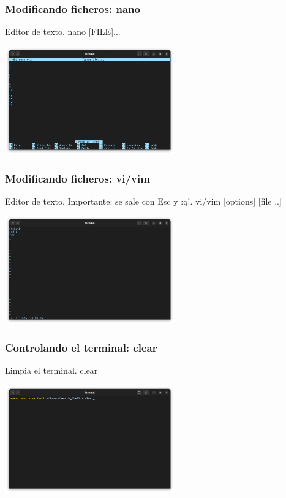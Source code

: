 \documentclass[10pt]{beamer}
\begin{document}
	\begin{frame}
		\frametitle{Modificando ficheros: nano}
		\begin{alertblock}{Editor de texto.}
			nano [FILE]...
		\end{alertblock}
		\begin{center}
			\includegraphics[width=0.55\textwidth]{nano}
		\end{center}
	\end{frame}
	
	\begin{frame}
		\frametitle{Modificando ficheros: vi/vim}
		\begin{alertblock}{Editor de texto. Importante: se sale con Esc y :q!.}
			vi/vim [options] [file ..]
		\end{alertblock}
		\begin{center}
			\includegraphics[width=0.55\textwidth]{vim}
		\end{center}
	\end{frame}
	
	\begin{frame}
		\frametitle{Controlando el terminal: clear}
		\begin{alertblock}{Limpia el terminal.}
			clear
		\end{alertblock}
		\begin{center}
			\includegraphics[width=0.55\textwidth]{clear}
		\end{center}

	\end{frame}	
	
\end{document}
